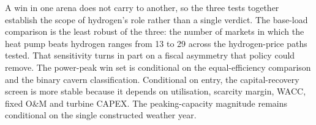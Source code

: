 A win in one arena does not carry to another, so the three tests together establish the scope of hydrogen's role rather than a single verdict. The base-load comparison is the least robust of the three: the number of markets in which the heat pump beats hydrogen ranges from 13 to 29 across the hydrogen-price paths tested. That sensitivity turns in part on a fiscal asymmetry that policy could remove. The power-peak win set is conditional on the equal-efficiency comparison and the binary cavern classification. Conditional on entry, the capital-recovery screen is more stable because it depends on utilisation, scarcity margin, WACC, fixed O\&M and turbine CAPEX. The peaking-capacity magnitude remains conditional on the single constructed weather year.
